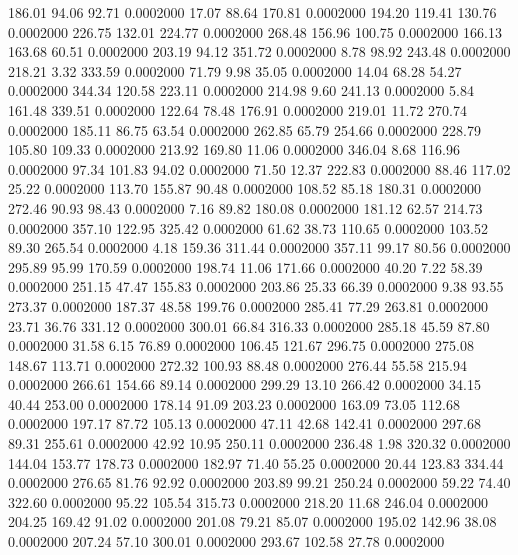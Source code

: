  186.01   94.06   92.71   0.0002000
  17.07   88.64  170.81   0.0002000
 194.20  119.41  130.76   0.0002000
 226.75  132.01  224.77   0.0002000
 268.48  156.96  100.75   0.0002000
 166.13  163.68   60.51   0.0002000
 203.19   94.12  351.72   0.0002000
   8.78   98.92  243.48   0.0002000
 218.21    3.32  333.59   0.0002000
  71.79    9.98   35.05   0.0002000
  14.04   68.28   54.27   0.0002000
 344.34  120.58  223.11   0.0002000
 214.98    9.60  241.13   0.0002000
   5.84  161.48  339.51   0.0002000
 122.64   78.48  176.91   0.0002000
 219.01   11.72  270.74   0.0002000
 185.11   86.75   63.54   0.0002000
 262.85   65.79  254.66   0.0002000
 228.79  105.80  109.33   0.0002000
 213.92  169.80   11.06   0.0002000
 346.04    8.68  116.96   0.0002000
  97.34  101.83   94.02   0.0002000
  71.50   12.37  222.83   0.0002000
  88.46  117.02   25.22   0.0002000
 113.70  155.87   90.48   0.0002000
 108.52   85.18  180.31   0.0002000
 272.46   90.93   98.43   0.0002000
   7.16   89.82  180.08   0.0002000
 181.12   62.57  214.73   0.0002000
 357.10  122.95  325.42   0.0002000
  61.62   38.73  110.65   0.0002000
 103.52   89.30  265.54   0.0002000
   4.18  159.36  311.44   0.0002000
 357.11   99.17   80.56   0.0002000
 295.89   95.99  170.59   0.0002000
 198.74   11.06  171.66   0.0002000
  40.20    7.22   58.39   0.0002000
 251.15   47.47  155.83   0.0002000
 203.86   25.33   66.39   0.0002000
   9.38   93.55  273.37   0.0002000
 187.37   48.58  199.76   0.0002000
 285.41   77.29  263.81   0.0002000
  23.71   36.76  331.12   0.0002000
 300.01   66.84  316.33   0.0002000
 285.18   45.59   87.80   0.0002000
  31.58    6.15   76.89   0.0002000
 106.45  121.67  296.75   0.0002000
 275.08  148.67  113.71   0.0002000
 272.32  100.93   88.48   0.0002000
 276.44   55.58  215.94   0.0002000
 266.61  154.66   89.14   0.0002000
 299.29   13.10  266.42   0.0002000
  34.15   40.44  253.00   0.0002000
 178.14   91.09  203.23   0.0002000
 163.09   73.05  112.68   0.0002000
 197.17   87.72  105.13   0.0002000
  47.11   42.68  142.41   0.0002000
 297.68   89.31  255.61   0.0002000
  42.92   10.95  250.11   0.0002000
 236.48    1.98  320.32   0.0002000
 144.04  153.77  178.73   0.0002000
 182.97   71.40   55.25   0.0002000
  20.44  123.83  334.44   0.0002000
 276.65   81.76   92.92   0.0002000
 203.89   99.21  250.24   0.0002000
  59.22   74.40  322.60   0.0002000
  95.22  105.54  315.73   0.0002000
 218.20   11.68  246.04   0.0002000
 204.25  169.42   91.02   0.0002000
 201.08   79.21   85.07   0.0002000
 195.02  142.96   38.08   0.0002000
 207.24   57.10  300.01   0.0002000
 293.67  102.58   27.78   0.0002000
